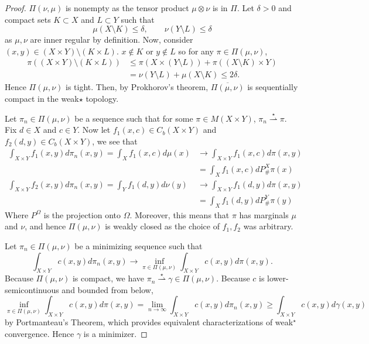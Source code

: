 \documentclass[12pt]{article}
\theoremstyle{plain}
\numberwithin{equation}{section}
\begin{document}
\begin{proof}
  $\Pi(\nu,\mu)$ is nonempty as the tensor product $\mu\otimes \nu$ is in $\Pi$. Let $\delta > 0$ and compact sets $K\subset X$ and $L\subset Y$ such that 
  \[\mu(X\setminus K) \le \delta,\qquad \nu(Y\setminus L)\le \delta\]
  as $\mu,\nu$ are inner regular by definition. Now, consider $(x,y)\in (X\times Y)\setminus (K\times L)$. $x\notin K$ or $y\notin L$ so for any $\pi\in\Pi(\mu,\nu)$, 
  \begin{align*}
    \pi((X\times Y)\setminus (K\times L)) &\le \pi(X\times (Y\setminus L)) + \pi((X\setminus K)\times Y) \\
    &= \nu(Y\setminus L) + \mu(X\setminus K) \le 2\delta.
  \end{align*}
  Hence $\Pi(\mu,\nu)$ is tight. Then, by Prokhorov's theorem, $\overline{\Pi(\mu,\nu)}$ is sequentially compact in the weak$\star$ topology.

  Let $\pi_n\in\Pi(\mu,\nu)$ be a sequence such that for some $\pi\in M(X\times Y)$, $\pi_n\overset{\star}{\rightharpoonup} \pi$. Fix $d\in X$ and $c\in Y$. Now let $f_1(x,c) \in C_b(X\times Y)$ and $f_2(d,y)\in C_b(X\times Y)$, we see that 
  \begin{align*}
    \int_{X\times Y} f_1(x,y)d\pi_n(x,y) = \int_{X} f_1(x,c)d\mu(x) &\to \int_{X\times Y} f_1(x,c)d\pi(x,y) \\
    &= \int_{X} f_1(x,c)dP^X_{\#}\pi(x) \\
    \int_{X\times Y} f_2(x,y)d\pi_n(x,y) = \int_{Y} f_1(d,y)d\nu(y) &\to \int_{X\times Y} f_1(d,y)d\pi(x,y) \\
    &= \int_{X} f_1(d,y)dP^Y_{\#}\pi(y)
  \end{align*}
  Where $P^\Omega$ is the projection onto $\Omega$. Moreover, this means that $\pi$ has marginals $\mu$ and $\nu$, and hence $\Pi(\mu,\nu)$ is weakly closed as the choice of $f_1,f_2$ was arbitrary.

  Let $\pi_n\in \Pi(\mu,\nu)$ be a minimizing sequence such that 
  \[\int_{X\times Y}c(x,y)d\pi_n(x,y) \to \inf_{\pi\in\Pi(\mu,\nu)}\int_{X\times Y}c(x,y)d\pi(x,y).\]
 Because $\Pi(\mu,\nu)$ is compact, we have $\pi_n\overset{\star}{\rightharpoonup}\gamma\in\Pi(\mu,\nu)$. Because $c$ is lower-semicontinuous and bounded from below,
 \begin{equation}
  \inf_{\pi\in\Pi(\mu,\nu)}\int_{X\times Y}c(x,y)d\pi(x,y) = \lim_{n\to\infty}\int_{X\times Y}c(x,y)d\pi_n(x,y) \ge \int_{X\times Y} c(x,y)d\gamma(x,y)
 \end{equation}
 by Portmanteau's Theorem, which provides equivalent characterizations of weak$^\star$ convergence. Hence $\gamma$ is a minimizer.
\end{proof}
\newpage
\end{document}
